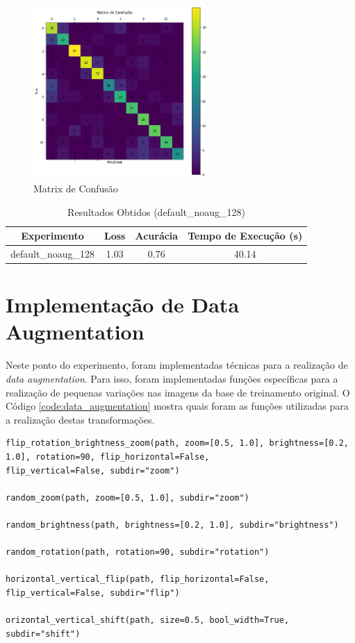 \documentclass[12pt]{article}
\begin{document}
\begin{figure}[!htb]
  \centering
  \includegraphics[width=18em]{experiments/default_noaug_128/confusion_matrix.png}
  \caption{Matrix de Confusão}
  \label{fig:experiment_default_noaug_128_confusion_matrix}
\end{figure}

\begin{table}[!htb]
  \centering
  \begin{tabular}{|c|c|c|c|}
    \hline
    \textbf{Experimento} & \textbf{Loss} & \textbf{Acurácia} & \textbf{Tempo de Execução (s)} \\ \hline
    default\_noaug\_128  & 1.03          & 0.76              & 40.14                          \\ \hline
  \end{tabular}
  \caption{Resultados Obtidos (default\_noaug\_128)}
  \label{tab:experiment_default_noaug_128_reults}
\end{table}

\newpage

\section{Implementação de Data Augmentation}

Neste ponto do experimento, foram implementadas técnicas para a realização de \textit{data augmentation}. Para isso, foram implementadas funções específicas para a realização de pequenas variações nas imagens da base de treinamento original. O Código \ref{code:data_augmentation} mostra quais foram as funções utilizadas para a realização destas transformações.

\begin{lstlisting}[caption={Funções de Transformação das Imagens},captionpos=b,frame=single,label={code:data_augmentation}]
flip_rotation_brightness_zoom(path, zoom=[0.5, 1.0], brightness=[0.2, 1.0], rotation=90, flip_horizontal=False,
flip_vertical=False, subdir="zoom")

random_zoom(path, zoom=[0.5, 1.0], subdir="zoom")

random_brightness(path, brightness=[0.2, 1.0], subdir="brightness")

random_rotation(path, rotation=90, subdir="rotation")

horizontal_vertical_flip(path, flip_horizontal=False, flip_vertical=False, subdir="flip")

orizontal_vertical_shift(path, size=0.5, bool_width=True, subdir="shift")
\end{lstlisting}
\end{document}
